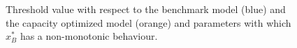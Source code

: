 

\begin{figure}[!htb]
	\begin{subfigmatrix}{3}
	\end{subfigmatrix}
	\caption{Threshold value with respect to the benchmark model (blue) and the capacity optimized model (orange) and parameters with which  $x^*_B$ has a non-monotonic behaviour.}
	\label{fig:2_x1}
\end{figure}


